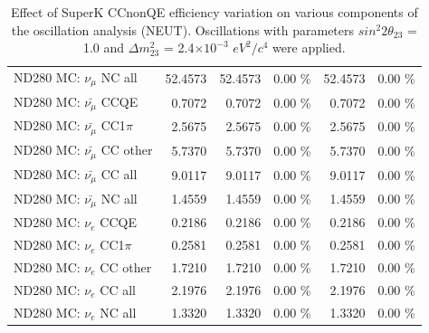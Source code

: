 \begin{table}
\begin{tabular}{| l | r | r  r | r  r |}
                                          ND280 MC: $\nu_{\mu}$ NC all &         52.4573 &         52.4573 &  0.00 \%  &         52.4573 &  0.00 \%  \\ 
                                      ND280 MC: $\bar{\nu_{\mu}}$ CCQE &          0.7072 &          0.7072 &  0.00 \%  &          0.7072 &  0.00 \%  \\ 
                                  ND280 MC: $\bar{\nu_{\mu}}$ CC1$\pi$ &          2.5675 &          2.5675 &  0.00 \%  &          2.5675 &  0.00 \%  \\ 
                                  ND280 MC: $\bar{\nu_{\mu}}$ CC other &          5.7370 &          5.7370 &  0.00 \%  &          5.7370 &  0.00 \%  \\ 
                                    ND280 MC: $\bar{\nu_{\mu}}$ CC all &          9.0117 &          9.0117 &  0.00 \%  &          9.0117 &  0.00 \%  \\ 
                                    ND280 MC: $\bar{\nu_{\mu}}$ NC all &          1.4559 &          1.4559 &  0.00 \%  &          1.4559 &  0.00 \%  \\ 
                                              ND280 MC: $\nu_{e}$ CCQE &          0.2186 &          0.2186 &  0.00 \%  &          0.2186 &  0.00 \%  \\ 
                                          ND280 MC: $\nu_{e}$ CC1$\pi$ &          0.2581 &          0.2581 &  0.00 \%  &          0.2581 &  0.00 \%  \\ 
                                          ND280 MC: $\nu_{e}$ CC other &          1.7210 &          1.7210 &  0.00 \%  &          1.7210 &  0.00 \%  \\ 
                                            ND280 MC: $\nu_{e}$ CC all &          2.1976 &          2.1976 &  0.00 \%  &          2.1976 &  0.00 \%  \\ 
                                            ND280 MC: $\nu_{e}$ NC all &          1.3320 &          1.3320 &  0.00 \%  &          1.3320 &  0.00 \%  \\ 
\hline
\end{tabular}
\caption{ 
  Effect of SuperK CCnonQE efficiency variation
  on various components of the oscillation analysis (NEUT).
  Oscillations with parameters $sin^{2}2\theta_{23}$ = 1.0 and $\Delta m^{2}_{23}$ = 2.4$\times10^{-3}$ $eV^{2}/c^{4}$ were applied.  
}
\label{tab:neut_sk_ccnonqe_eff}
\end{table}


%
%
%
%

